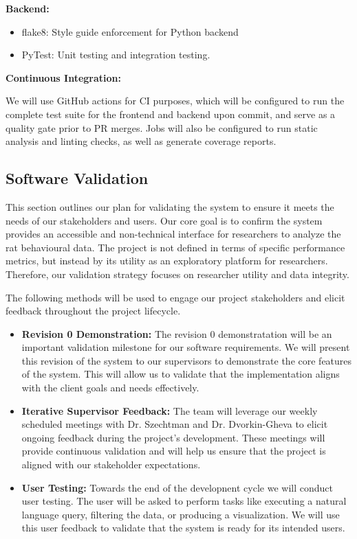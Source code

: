 \documentclass[12pt, titlepage]{article}
\begin{document}
\textbf{Backend:}
\begin{itemize}
  \item flake8: Style guide enforcement for Python backend
  \item PyTest: Unit testing and integration testing. 
\end{itemize}

\textbf{Continuous Integration:}

We will use GitHub actions for CI purposes, which will be configured to run the complete test suite for the frontend and backend upon commit, and serve as a quality gate prior to PR merges. Jobs will also be configured to run static analysis and linting checks, as well as generate coverage reports. 


\subsection{Software Validation}


This section outlines our plan for validating the system to ensure it meets the needs of our stakeholders and users. Our core goal is to confirm the system provides an accessible and non-technical interface for researchers to analyze the rat behavioural data. The project is not defined in terms of specific performance metrics, but instead by its utility as an exploratory platform for researchers. Therefore, our validation strategy focuses on researcher utility and data integrity. 


The following methods will be used to engage our project stakeholders and elicit feedback throughout the project lifecycle. 

\begin{itemize}
  \item \textbf{ Revision 0 Demonstration:}  The revision 0 demonstratation will be an important validation milestone for our software requirements. We will present this revision of the system to our supervisors to demonstrate the core features of the system. This will allow us to validate that the implementation aligns with the client goals and needs effectively. 
  \item \textbf{Iterative Supervisor Feedback:} The team will leverage our weekly scheduled meetings with Dr. Szechtman and Dr. Dvorkin-Gheva to elicit ongoing feedback during the project's development. These meetings will provide continuous validation and will help us ensure that the project is aligned with our stakeholder expectations.  
  \item \textbf{User Testing:} Towards the end of the developnent cycle we will conduct user testing. The user will be asked to perform tasks like executing a natural language query, filtering the data, or producing a visualization. We will use this user feedback to validate that the system is ready for its intended users.  
 \end{itemize}
\end{document}
